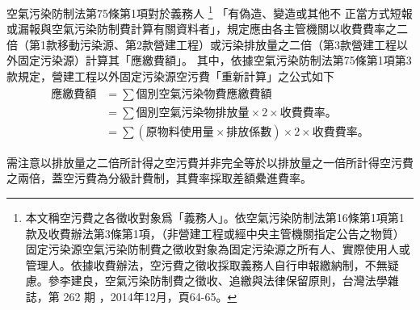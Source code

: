 \documentclass[11pt,a4paper]{article}
\begin{document}
空氣污染防制法第75條第1項對於義務人
\footnote{本文稱空污費之各徵收對象爲「義務人」。依空氣污染防制法第16條第1項第1款及收費辦法第3條第1項，（非營建工程或經中央主管機關指定公告之物質）固定污染源空氣污染防制費之徵收對象為固定污染源之所有人、實際使用人或管理人。依據收費辦法，空污費之徵收採取義務人自行申報繳納制，不無疑慮。參李建良，空氣污染防制費之徵收、追繳與法律保留原則，台灣法學雜誌，第 262 期 ，2014年12月，頁64-65。}
「有偽造、變造或其他不
正當方式短報或漏報與空氣污染防制費計算有關資料者」，規定應由各主管機關以收費費率之二倍（第1款移動污染源、第2款營建工程）或污染排放量之二倍（第3款營建工程以外固定污染源）計算其「應繳費額」。
其中，依據空氣污染防制法第75條第1項第3款規定，營建工程以外固定污染源空污費「重新計算」之公式如下
\begin{equation*}
\begin{aligned}
   \text{應繳費額}&=\sum \text{個別空氣污染物費應繳費額}\\
   &=\sum\text{個別空氣污染物排放量}\times 2 \times \text{收費費率。}\\
   &=\sum\left(\text{原物料使用量}\times\text{排放係數}\right)\times 2 \times
   \text{收費費率。}
\end{aligned}
\end{equation*}

需注意以排放量之二倍所計得之空污費并非完全等於以排放量之一倍所計得空污費之兩倍，蓋空污費為分級計費制，其費率採取差額纍進費率。
\end{document}
